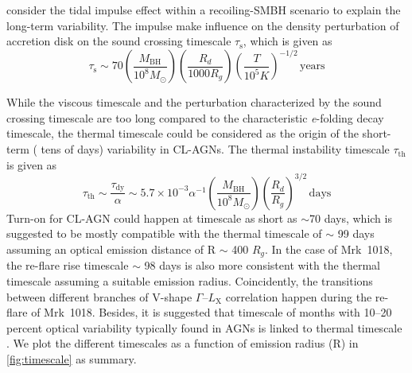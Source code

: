 \documentclass[twocolumn]{aastex63}
\begin{document}
\citet{2018ApJ...861...51K} consider the tidal impulse effect within a recoiling-SMBH scenario to explain the long-term variability. The impulse make influence on the density perturbation of accretion disk on the sound crossing timescale $\tau_\mathrm{s}$, which is given as
\begin{equation}
\tau_\mathrm{s} \sim 70 (\frac{M_\mathrm{BH}}{10^8M_{\odot}})(\frac{R_d}{1000 R_g}) (\frac{T}{10^5 K})^{-1/2} \, \mathrm{years}
\end{equation}

While the viscous timescale and the perturbation characterized by the sound crossing timescale are too long compared to the characteristic \textit{e}-folding decay timescale, the thermal timescale could be considered as the origin of the short-term ( tens of days) variability in CL-AGNs. The thermal instability timescale $\tau_\mathrm{th}$ is given as
\begin{equation}
\tau_\mathrm{th} \sim \frac{\tau_\mathrm{dy}}{\alpha} \sim 5.7\times 10^{-3} \alpha^{-1}(\frac{M_\mathrm{BH}}{10^8M_{\odot}})(\frac{R_d}{R_g})^{3/2} \, \mathrm{days}
\end{equation}
Turn-on for CL-AGN could happen at timescale as short as $\sim$70 days\citep[e.g.][]{2019MNRAS.487.4057K},  which is suggested to be mostly compatible with the thermal timescale of $\sim$ 99 days assuming an optical emission distance of R $\sim$ 400 $R_g$. In the case of Mrk~1018, the re-flare rise timescale $\sim$ 98 days is also more consistent with the thermal timescale assuming a suitable emission radius. Coincidently, the transitions between different branches of V-shape $\Gamma$--$L_\mathrm{X}$ correlation happen during the re-flare of Mrk~1018. Besides, it is suggested that timescale of months with 10--20 percent optical variability typically found in AGNs is linked to thermal timescale \citep[see also discussion in ][]{2018MNRAS.480.3898N}. We plot the different timescales as a function of emission radius (R) in \autoref{fig:timescale} as summary. 
\end{document}
